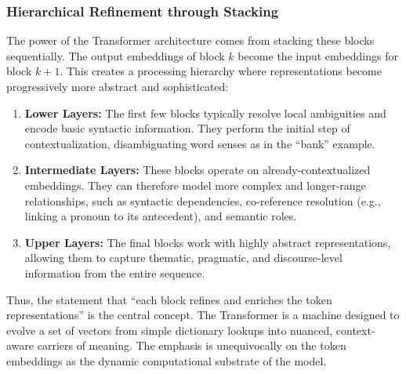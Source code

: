 \documentclass[%
  reprint,
  superscriptaddress,
  showpacs,
  showkeys,
  amsmath,amssymb,
  pra,
  longbibliography,
  floatfix,
  x11names
]{revtex4-2}
\begin{document}
\subsubsection{Hierarchical Refinement through Stacking}
The power of the Transformer architecture comes from stacking these blocks sequentially. The output embeddings of block $k$ become the input embeddings for block $k+1$. This creates a processing hierarchy where representations become progressively more abstract and sophisticated:
\begin{enumerate}
    \item \textbf{Lower Layers:} The first few blocks typically resolve local ambiguities and encode basic syntactic information. They perform the initial step of contextualization, disambiguating word senses as in the ``bank'' example.
    \item \textbf{Intermediate Layers:} These blocks operate on already-contextualized embeddings. They can therefore model more complex and longer-range relationships, such as syntactic dependencies, co-reference resolution (e.g., linking a pronoun to its antecedent), and semantic roles.
    \item \textbf{Upper Layers:} The final blocks work with highly abstract representations, allowing them to capture thematic, pragmatic, and discourse-level information from the entire sequence.
\end{enumerate}
Thus, the statement that ``each block refines and enriches the token representations'' is the central concept. The Transformer is a machine designed to evolve a set of vectors from simple dictionary lookups into nuanced, context-aware carriers of meaning. The emphasis is unequivocally on the token embeddings as the dynamic computational substrate of the model.



\end{document}

